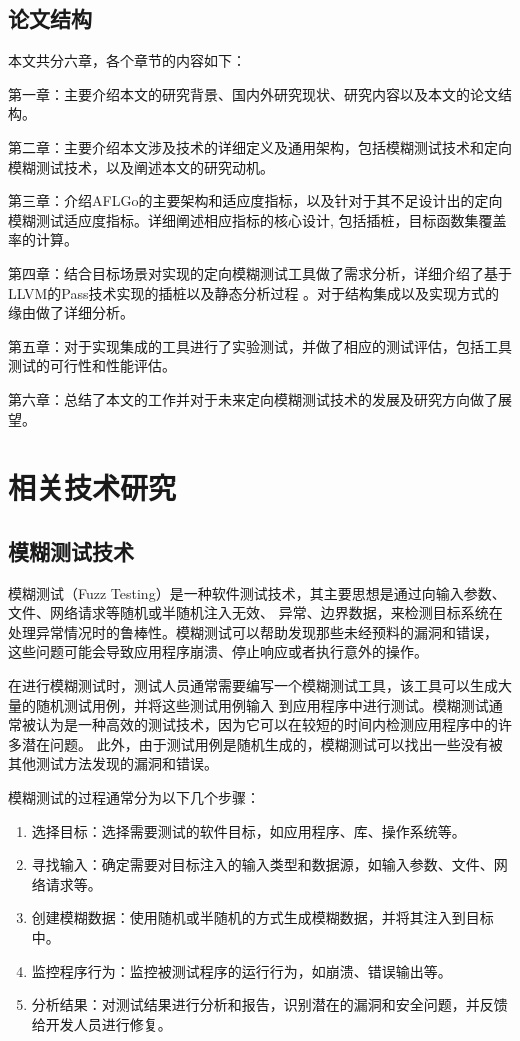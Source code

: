 \documentclass[bachelor]{njupthesis}
\begin{document}
\section{论文结构}
本文共分六章，各个章节的内容如下：

第一章：主要介绍本文的研究背景、国内外研究现状、研究内容以及本文的论文结构。

第二章：主要介绍本文涉及技术的详细定义及通用架构，包括模糊测试技术和定向模糊测试技术，以及阐述本文的研究动机。

第三章：介绍AFLGo的主要架构和适应度指标，以及针对于其不足设计出的定向模糊测试适应度指标。详细阐述相应指标的核心设计,
包括插桩，目标函数集覆盖率的计算。

第四章：结合目标场景对实现的定向模糊测试工具做了需求分析，详细介绍了基于LLVM的Pass技术实现的插桩以及静态分析过程
。对于结构集成以及实现方式的缘由做了详细分析。

第五章：对于实现集成的工具进行了实验测试，并做了相应的测试评估，包括工具测试的可行性和性能评估。

第六章：总结了本文的工作并对于未来定向模糊测试技术的发展及研究方向做了展望。

\chapter{相关技术研究}
\section{模糊测试技术}
模糊测试（Fuzz Testing）是一种软件测试技术，其主要思想是通过向输入参数、文件、网络请求等随机或半随机注入无效、
异常、边界数据，来检测目标系统在处理异常情况时的鲁棒性。模糊测试可以帮助发现那些未经预料的漏洞和错误，
这些问题可能会导致应用程序崩溃、停止响应或者执行意外的操作。

在进行模糊测试时，测试人员通常需要编写一个模糊测试工具，该工具可以生成大量的随机测试用例，并将这些测试用例输入
到应用程序中进行测试。模糊测试通常被认为是一种高效的测试技术，因为它可以在较短的时间内检测应用程序中的许多潜在问题。
此外，由于测试用例是随机生成的，模糊测试可以找出一些没有被其他测试方法发现的漏洞和错误。

模糊测试的过程通常分为以下几个步骤：

\begin{enumerate}[label=(\arabic*)]
	\item 选择目标：选择需要测试的软件目标，如应用程序、库、操作系统等。
	\item 寻找输入：确定需要对目标注入的输入类型和数据源，如输入参数、文件、网络请求等。
	\item 创建模糊数据：使用随机或半随机的方式生成模糊数据，并将其注入到目标中。
	\item 监控程序行为：监控被测试程序的运行行为，如崩溃、错误输出等。
	\item 分析结果：对测试结果进行分析和报告，识别潜在的漏洞和安全问题，并反馈给开发人员进行修复。
\end{enumerate}
\end{document}
